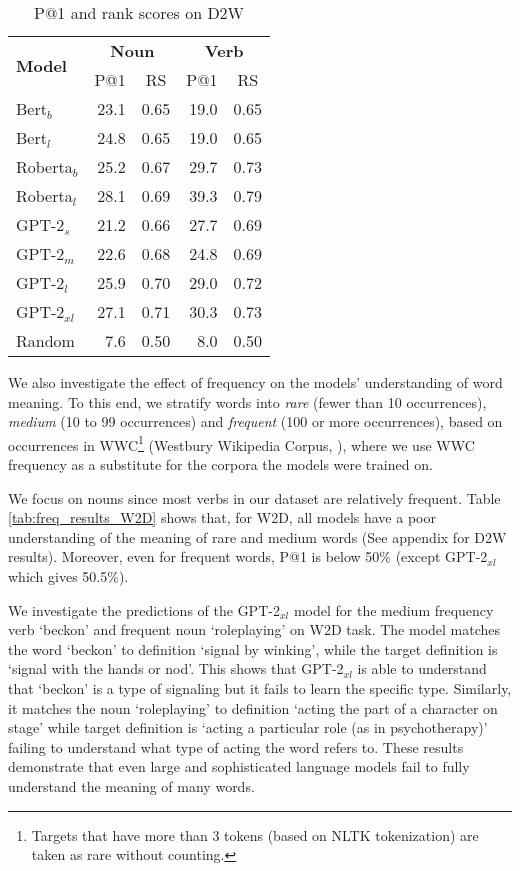 \documentclass[11pt,a4paper]{article}
\begin{document}
\begin{table}
    \centering
    \begin{tabular}{l|rrrr}
        \hline
         \multirow{2}{*}{\textbf{Model}} & \multicolumn{2}{c}{\textbf{Noun}} & \multicolumn{2}{c}{\textbf{Verb}} \\
         & \multicolumn{1}{c}{P@1} & \multicolumn{1}{c}{RS} & \multicolumn{1}{c}{P@1} & \multicolumn{1}{c}{RS} \\ \hline
     Bert$_{b}$ & 23.1 & 0.65 & 19.0 & 0.65 \\
     Bert$_{l}$ & 24.8 & 0.65 & 19.0 & 0.65 \\
     Roberta$_{b}$ & 25.2 & 0.67 & 29.7 & 0.73 \\
     Roberta$_{l}$ & 28.1 & 0.69 & 39.3 & 0.79 \\ \hline
     GPT-2$_{s}$ & 21.2 & 0.66 & 27.7 & 0.69 \\
     GPT-2$_{m}$ & 22.6 & 0.68 & 24.8 & 0.69 \\
     GPT-2$_{l}$ & 25.9 & 0.70 & 29.0 & 0.72 \\
     GPT-2$_{xl}$ & 27.1 & 0.71 & 30.3 & 0.73 \\ \hline 
     Random & 7.6 & 0.50 & 8.0 & 0.50 \\\hline
     
    \end{tabular}
    \caption{P@1 and rank scores on D2W}
    \label{tab:results_D2W}
\end{table}


We also investigate the effect of frequency on the models' understanding of word meaning.
To this end, we stratify words into \textit{rare} (fewer than 10 occurrences), \textit{medium} (10 to 99 occurrences) and \textit{frequent} (100 or more occurrences), based on occurrences in WWC\footnote{Targets that have more than 3 tokens (based on NLTK tokenization) are taken as rare without counting.} (Westbury Wikipedia Corpus, ), where we use WWC frequency as a substitute for the corpora the models were trained on.

We focus on nouns since most verbs in our dataset are relatively frequent. 
Table \ref{tab:freq_results_W2D} shows that, for W2D, all models have a poor understanding of the meaning of rare and medium words (See appendix for D2W results). 
Moreover, even for frequent words, P@1 is below 50\% (except GPT-2$_{xl}$ which gives 50.5\%). 

We investigate the predictions of the GPT-2$_{xl}$ model for the medium frequency verb `beckon' and frequent noun `roleplaying' on W2D task. The model matches the word `beckon' to definition `signal by winking', while the target definition is `signal with the hands or nod'. This shows that GPT-2$_{xl}$ is able to understand that `beckon' is a type of signaling but it fails to learn the specific type. Similarly, it matches the noun `roleplaying' to definition `acting the part of a character on stage' while target definition is `acting a particular role (as in psychotherapy)' failing to understand what type of acting the word refers to. These results demonstrate that even large and sophisticated language models fail to fully understand the meaning of many words. 
\end{document}
